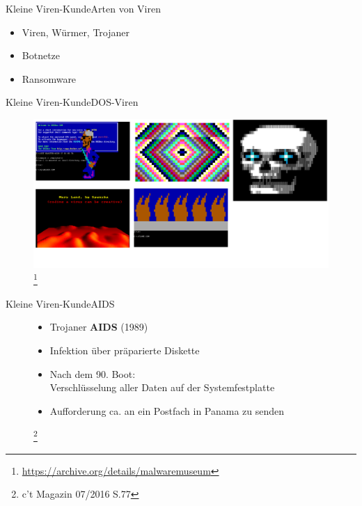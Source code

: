 \documentclass[10pt]{beamer}
\begin{document}
\begin{frame}{Kleine Viren-Kunde}{Arten von Viren}
\begin{itemize}
	\item Viren, Würmer, Trojaner
	\item Botnetze
	\item Ransomware
\end{itemize}
\end{frame}

\begin{frame}{Kleine Viren-Kunde}{DOS-Viren}
	\begin{figure}[p]
		\centering
		\includegraphics[scale=0.11]{dos_viruses.png}
		\let\thefootnote\relax\footnote{\url{https://archive.org/details/malwaremuseum}}
	\end{figure}
\end{frame}
\begin{frame}{Kleine Viren-Kunde}{AIDS}
	\begin{figure}[p]
		\begin{itemize}
			\item Trojaner \textbf{AIDS} (1989)
			\item Infektion über präparierte Diskette
			\item Nach dem 90. Boot: \\ Verschlüsselung aller Daten auf der Systemfestplatte
			\item Aufforderung ca.  an ein Postfach in Panama zu senden
		\end{itemize}
		\let\thefootnote\relax\footnote{c't Magazin 07/2016 S.77}
	\end{figure}
\end{frame}
\end{document}
